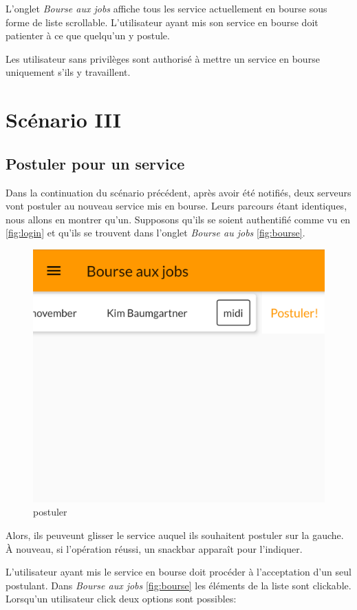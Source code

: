 L'onglet \textit{Bourse aux jobs} affiche tous les service actuellement en bourse sous
forme de liste scrollable. L'utilisateur ayant mis son service en bourse
doit patienter à ce que quelqu'un y postule.

Les utilisateur sans privilèges sont authorisé à mettre un service en bourse uniquement s'ils y travaillent.

\section[Postuler pour un service - Scénario III]{Scénario III}
    \subsection*{Postuler pour un service}
    Dans la continuation du scénario précédent, après avoir été notifiés,
    deux serveurs vont postuler au nouveau service mis
    en bourse. Leurs parcours étant identiques, nous allons en montrer qu'un.
    Supposons qu'ils se soient authentifié comme vu en \ref{fig:login} et qu'ils se trouvent
    dans l'onglet \textit{Bourse au jobs} \ref{fig:bourse}.

    \begin{figure}[h]
        \centering
        \includegraphics[width=.3\linewidth]{screenshots/scenario_03/postuler.png}
        \caption{postuler}
        \label{fig:postuler}
    \end{figure}

    Alors, ils peuveunt glisser le service auquel ils souhaitent postuler sur
    la gauche. À nouveau, si l'opération réussi, un snackbar apparaît pour l'indiquer.

    L'utilisateur ayant mis le service en bourse doit procéder à l'acceptation
    d'un seul postulant. Dans \textit{Bourse aux jobs} \ref{fig:bourse} les éléments de 
    la liste sont clickable. Lorsqu'un utilisateur click deux options sont possibles:

